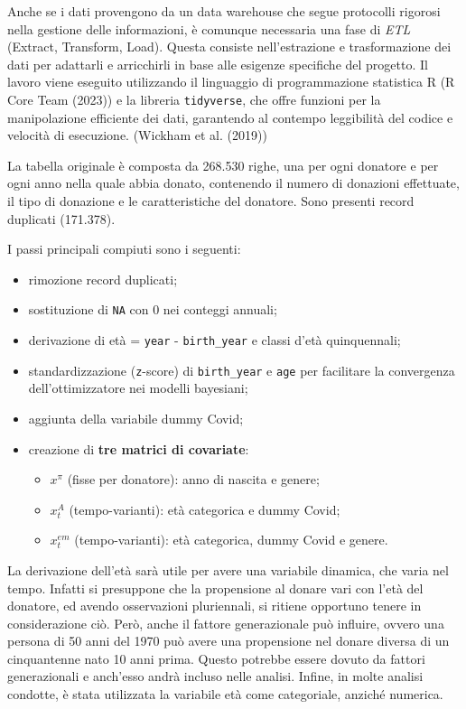 \documentclass[
  italian,
  a4paper,
  a4paper,
  twoside,
  open=right,
  12pt]{scrbook}
\theoremstyle{definition}
\theoremstyle{remark}
\begin{document}
Anche se i dati provengono da un data warehouse che segue protocolli
rigorosi nella gestione delle informazioni, è comunque necessaria una
fase di \emph{ETL} (Extract, Transform, Load). Questa consiste
nell'estrazione e trasformazione dei dati per adattarli e arricchirli in
base alle esigenze specifiche del progetto. Il lavoro viene eseguito
utilizzando il linguaggio di programmazione statistica R (R Core Team
(2023)) e la libreria \texttt{tidyverse}, che offre funzioni per la
manipolazione efficiente dei dati, garantendo al contempo leggibilità
del codice e velocità di esecuzione. (Wickham et al. (2019))

La tabella originale è composta da 268.530 righe, una per ogni donatore
e per ogni anno nella quale abbia donato, contenendo il numero di
donazioni effettuate, il tipo di donazione e le caratteristiche del
donatore. Sono presenti record duplicati (171.378).

I passi principali compiuti sono i seguenti:

\begin{itemize}
\item
  rimozione record duplicati;
\item
  sostituzione di \texttt{NA} con 0 nei conteggi annuali;
\item
  derivazione di età = \texttt{year} - \texttt{birth\_year} e classi
  d'età quinquennali;
\item
  standardizzazione (\texttt{z}-score) di \texttt{birth\_year} e
  \texttt{age} per facilitare la convergenza dell'ottimizzatore nei
  modelli bayesiani;
\item
  aggiunta della variabile dummy Covid;
\item
  creazione di \textbf{tre matrici di covariate}:

  \begin{itemize}
  \item
    \(x^\pi\) (fisse per donatore): anno di nascita e genere;
  \item
    \(x^A_{t}\) (tempo-varianti): età categorica e dummy Covid;
  \item
    \(x^{em}_{t}\) (tempo-varianti): età categorica, dummy Covid e
    genere.
  \end{itemize}
\end{itemize}

La derivazione dell'età sarà utile per avere una variabile dinamica, che
varia nel tempo. Infatti si presuppone che la propensione al donare vari
con l'età del donatore, ed avendo osservazioni pluriennali, si ritiene
opportuno tenere in considerazione ciò. Però, anche il fattore
generazionale può influire, ovvero una persona di 50 anni del 1970 può
avere una propensione nel donare diversa di un cinquantenne nato 10 anni
prima. Questo potrebbe essere dovuto da fattori generazionali e
anch'esso andrà incluso nelle analisi. Infine, in molte analisi
condotte, è stata utilizzata la variabile età come categoriale, anziché
numerica.
\end{document}
